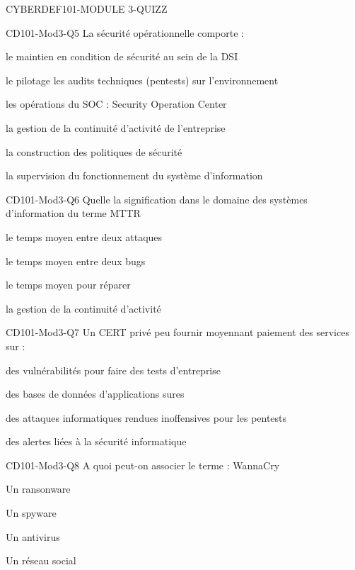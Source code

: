 \documentclass[12pt]{article}
\begin{document}
\begin{quiz}{CYBERDEF101-MODULE 3-QUIZZ}
\begin{multi}[multiple=true]{CD101-Mod3-Q5} 
La s\'ecurit\'e op\'erationnelle comporte  : 
\item* le maintien en condition de s\'ecurit\'e au sein de la DSI
\item* le pilotage les audits techniques (pentests) sur l'environnement	
\item* les op\'erations du SOC : Security Operation Center	
\item la gestion de la continuit\'e d'activit\'e de l'entreprise
\item la construction des politiques de s\'ecurit\'e
\item la supervision du fonctionnement du syst\`eme d'information
\end{multi}


\begin{multi}[multiple=true]{CD101-Mod3-Q6} 
Quelle la signification dans le domaine des syst\`emes d'information du terme MTTR 
\item le temps moyen entre deux attaques
\item le temps moyen entre deux bugs	
\item* le temps moyen pour r\'eparer
\item la gestion de la continuit\'e d'activit\'e
\end{multi}

\begin{multi}[multiple=true]{CD101-Mod3-Q7} 
Un CERT priv\'e peu fournir moyennant paiement des services sur :
\item* des vuln\'erabilit\'es pour faire des tests d'entreprise
\item des bases de donn\'ees d'applications sures 
\item des attaques informatiques rendues inoffensives pour les pentests	
\item* des alertes li\'ees \`a la s\'ecurit\'e informatique
\end{multi}


\begin{multi}[multiple=true]{CD101-Mod3-Q8}
A quoi peut-on associer le terme : WannaCry 
\item* Un ransonware
\item Un spyware
\item Un antivirus
\item Un r\'eseau social
\end{multi}


\end{quiz}
\end{document}
